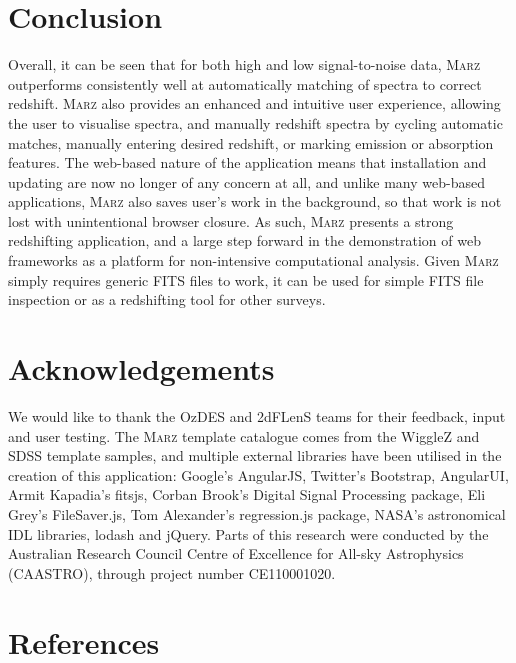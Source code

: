 \documentclass[5p]{elsarticle}
\newcommand{\marz}{\textsc{Marz}}
\begin{document}
\clearpage



\section{Conclusion} \label{sec:conclusion}

Overall, it can be seen that for both high and low signal-to-noise data, \marz{} outperforms consistently well at automatically matching of spectra to correct redshift. \marz{} also provides an enhanced and intuitive user experience, allowing the user to visualise spectra, and manually redshift spectra by cycling automatic matches, manually entering desired redshift, or marking emission or absorption features. The web-based nature of the application means that installation and updating are now no longer of any concern at all, and unlike many web-based applications, \marz{} also saves user's work in the background, so that work is not lost with unintentional browser closure. As such, \marz{} presents a strong redshifting application, and a large step forward in the demonstration of web frameworks as a platform for non-intensive computational analysis. Given \marz{} simply requires generic FITS files to work, it can be used for simple FITS file inspection or as a redshifting tool for other surveys.

\section*{Acknowledgements}
We would like to thank the OzDES and 2dFLenS teams for their feedback, input and user testing. The \marz{} template catalogue comes from the WiggleZ and SDSS template samples, and multiple external libraries have been utilised in the creation of this application: Google's AngularJS, Twitter's Bootstrap, AngularUI, Armit Kapadia's fitsjs, Corban Brook's Digital Signal Processing package, Eli Grey's FileSaver.js, Tom Alexander's regression.js package, NASA's astronomical IDL libraries, lodash and jQuery. Parts of this research were conducted by the Australian Research Council Centre of Excellence for All-sky Astrophysics (CAASTRO), through project number CE110001020.

\newpage 
\section*{References}


%
%
\end{document}
